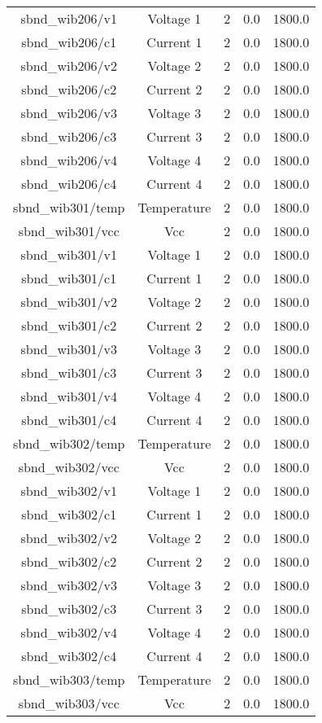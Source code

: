 \begin{table}[ptb]
\begin{tabular}{c | c c c c}
sbnd_wib206/v1 & Voltage 1 & 2 & 0.0 & 1800.0\\ 
sbnd_wib206/c1 & Current 1 & 2 & 0.0 & 1800.0\\ 
sbnd_wib206/v2 & Voltage 2 & 2 & 0.0 & 1800.0\\ 
sbnd_wib206/c2 & Current 2 & 2 & 0.0 & 1800.0\\ 
sbnd_wib206/v3 & Voltage 3 & 2 & 0.0 & 1800.0\\ 
sbnd_wib206/c3 & Current 3 & 2 & 0.0 & 1800.0\\ 
sbnd_wib206/v4 & Voltage 4 & 2 & 0.0 & 1800.0\\ 
sbnd_wib206/c4 & Current 4 & 2 & 0.0 & 1800.0\\ 
sbnd_wib301/temp & Temperature & 2 & 0.0 & 1800.0\\ 
sbnd_wib301/vcc & Vcc & 2 & 0.0 & 1800.0\\ 
sbnd_wib301/v1 & Voltage 1 & 2 & 0.0 & 1800.0\\ 
sbnd_wib301/c1 & Current 1 & 2 & 0.0 & 1800.0\\ 
sbnd_wib301/v2 & Voltage 2 & 2 & 0.0 & 1800.0\\ 
sbnd_wib301/c2 & Current 2 & 2 & 0.0 & 1800.0\\ 
sbnd_wib301/v3 & Voltage 3 & 2 & 0.0 & 1800.0\\ 
sbnd_wib301/c3 & Current 3 & 2 & 0.0 & 1800.0\\ 
sbnd_wib301/v4 & Voltage 4 & 2 & 0.0 & 1800.0\\ 
sbnd_wib301/c4 & Current 4 & 2 & 0.0 & 1800.0\\ 
sbnd_wib302/temp & Temperature & 2 & 0.0 & 1800.0\\ 
sbnd_wib302/vcc & Vcc & 2 & 0.0 & 1800.0\\ 
sbnd_wib302/v1 & Voltage 1 & 2 & 0.0 & 1800.0\\ 
sbnd_wib302/c1 & Current 1 & 2 & 0.0 & 1800.0\\ 
sbnd_wib302/v2 & Voltage 2 & 2 & 0.0 & 1800.0\\ 
sbnd_wib302/c2 & Current 2 & 2 & 0.0 & 1800.0\\ 
sbnd_wib302/v3 & Voltage 3 & 2 & 0.0 & 1800.0\\ 
sbnd_wib302/c3 & Current 3 & 2 & 0.0 & 1800.0\\ 
sbnd_wib302/v4 & Voltage 4 & 2 & 0.0 & 1800.0\\ 
sbnd_wib302/c4 & Current 4 & 2 & 0.0 & 1800.0\\ 
sbnd_wib303/temp & Temperature & 2 & 0.0 & 1800.0\\ 
sbnd_wib303/vcc & Vcc & 2 & 0.0 & 1800.0\\ 

\end{tabular}
\end{table}
